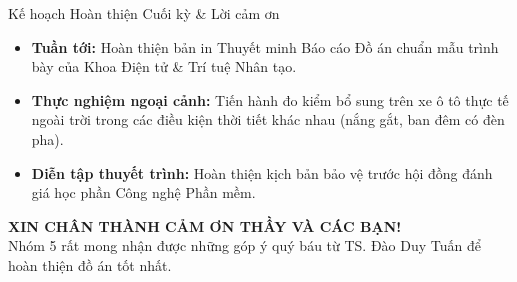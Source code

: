 \documentclass[aspectratio=169, 11pt]{beamer}
\begin{document}
\begin{frame}{Kế hoạch Hoàn thiện Cuối kỳ \& Lời cảm ơn}
  \vspace{-0.15cm}
  \par
  \vspace{0.05cm}
  {\fontsize{7.2pt}{9.0pt}\selectfont
  \begin{itemize}
    \item \textbf{Tuần tới:} Hoàn thiện bản in Thuyết minh Báo cáo Đồ án chuẩn mẫu trình bày của Khoa Điện tử \& Trí tuệ Nhân tạo.
    \item \textbf{Thực nghiệm ngoại cảnh:} Tiến hành đo kiểm bổ sung trên xe ô tô thực tế ngoài trời trong các điều kiện thời tiết khác nhau (nắng gắt, ban đêm có đèn pha).
    \item \textbf{Diễn tập thuyết trình:} Hoàn thiện kịch bản bảo vệ trước hội đồng đánh giá học phần Công nghệ Phần mềm.
  \end{itemize}}

  \vspace{0.25cm}
  \centering
  \begin{tcolorbox}[
    enhanced, colback=FacultyNavy, colframe=FacultyNavy, boxrule=1.0pt, arc=4pt,
    top=8pt, bottom=8pt, left=12pt, right=12pt
  ]
    \centering
    {\fontsize{13pt}{17pt}\selectfont\bfseries\color{FacultyYellow} XIN CHÂN THÀNH CẢM ƠN THẦY VÀ CÁC BẠN!}\\[0.18cm]
    {\fontsize{8.5pt}{11pt}\selectfont\color{white} Nhóm 5 rất mong nhận được những góp ý quý báu từ TS. Đào Duy Tuấn để hoàn thiện đồ án tốt nhất.}
  \end{tcolorbox}
\end{frame}
\end{document}
